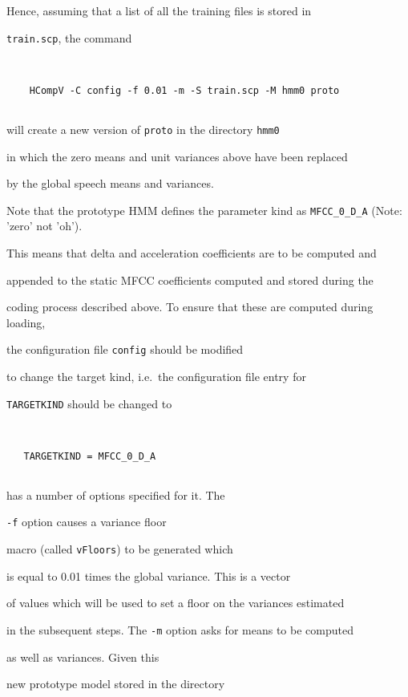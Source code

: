 Hence, assuming that a list of all the training files is stored in


\texttt{train.scp}, the command


\begin{verbatim}


    HCompV -C config -f 0.01 -m -S train.scp -M hmm0 proto


\end{verbatim}


will create a new version of \texttt{proto} in the directory \texttt{hmm0}


in which the zero means and unit variances above have been replaced


by the global speech means and variances.


Note that the prototype HMM defines the parameter kind as \texttt{MFCC\_0\_D\_A} (Note: 'zero' not 'oh').


This means that delta and acceleration coefficients are to be computed and


appended to the static MFCC coefficients computed and stored during the


coding process described above.  To ensure that these are computed during loading,


the configuration file \texttt{config} should be modified


to change the target kind, i.e.\ the configuration file entry for


\texttt{TARGETKIND} should be changed to


\begin{verbatim}


   TARGETKIND = MFCC_0_D_A


\end{verbatim}


 has a number of options specified for it.  The 


\texttt{-f} option causes a variance floor 


macro (called \texttt{vFloors}) to be generated which


is equal to 0.01 times the global variance.  This is a vector


of values which will be used to set a floor on the variances estimated


in the subsequent steps.  The \texttt{-m} option asks for means to be computed


as well as variances.  Given this


new prototype model stored in the directory


